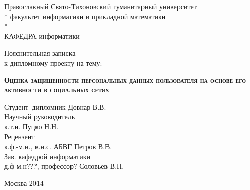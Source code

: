 \begin{titlepage}
\newpage
\begin{center}
\vspace{1cm}
Православный Свято-Тихоновский гуманитарный университет \\*
факультет информатики и прикладной математики\\*
\hrulefill \\
КАФЕДРА информатики
\end{center}

\vspace{8em}

\begin{center}
\Large Пояснительная записка \\ к дипломному проекту на тему:
\end{center}

\vspace{2.5em}

\begin{center}
\textsc{\textbf{Оценка защищенности персональных данных пользователя на основе его активности в социальных сетях}}
\end{center}

\vspace{6em}

\begin{flushleft}
Студент--дипломник \hrulefill Довнар В.В.\\
\vspace{1.5em}
Научный руководитель \\
к.т.н. \hrulefill Пуцко Н.Н.\\
\vspace{1.5em}
Рецензент \\
к.ф.-м.н., в.н.с. АБВГ \hrulefill Петров В.В.\\
\vspace{1.5em}
Зав. кафедрой информатики\\
д.ф-м.н???, профессор? \hrulefill Соловьев В.П.
\end{flushleft}

\vspace{\fill}

\begin{center}
Москва 2014
\end{center}
\end{titlepage}